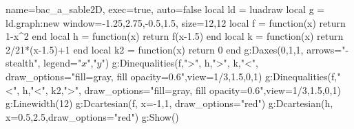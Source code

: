 \documentclass[border=5pt]{standalone} %
\begin{document}
\begin{luadraw}{name=bac_a_sable2D, exec=true, auto=false}
local ld = luadraw
local g = ld.graph:new{ window={-1.25,2.75,-0.5,1.5}, size={12,12} }
local f = function(x) return 1-x^2 end
local h = function(x) return f(x-1.5) end
local k = function(x) return 2/21*(x-1.5)+1 end
local k2 = function(x) return 0 end
g:Daxes({0,1,1}, {arrows="-stealth", legend={"$x$","$y$"}})
g:Dinequalities({f,">", h,">", k,"<"}, 
    {draw_options="fill=gray, fill opacity=0.6",view={1/3,1.5,0,1}})
g:Dinequalities({f,"<", h,"<", k2,">"}, 
    {draw_options="fill=gray, fill opacity=0.6",view={1/3,1.5,0,1}})
g:Linewidth(12)    
g:Dcartesian(f, {x={-1,1}, draw_options="red"})
g:Dcartesian(h, {x={0.5,2.5},draw_options="red"})
g:Show()
\end{luadraw}
\end{document}
